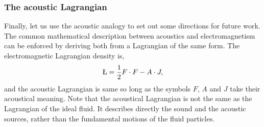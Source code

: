 \documentclass[10pt, fleqn,final,showtrims,oldfontcommands]{article} %
\newcommand{\eqnref}[1]{\ref{eqn:#1}}
\begin{document}

\subsubsection{The acoustic Lagrangian}\label{sec:int:spin}
Finally, let us use the acoustic analogy to set out some directions for future work.
%
The common mathematical  description between acoustics and electromagnetism can be enforced by deriving both from a Lagrangian of the same form.
The electromagnetic Lagrangian density is\cite{Lasenby1993, Doran2003},
\begin{align}
 \L = \frac{1}{2} F \cdot F  - A \cdot J, \label{eqn:Lagrangian}
\end{align}
and the acoustic Lagrangian is same so long as the symbols $F$, $A$ and $J$ take their 
acoustical meaning.
Note that the acoustical Lagrangian is not the same as the Lagrangian of the ideal fluid.
It describes directly the sound and the acoustic sources,
rather than the fundamental motions of the fluid particles.
\end{document}
